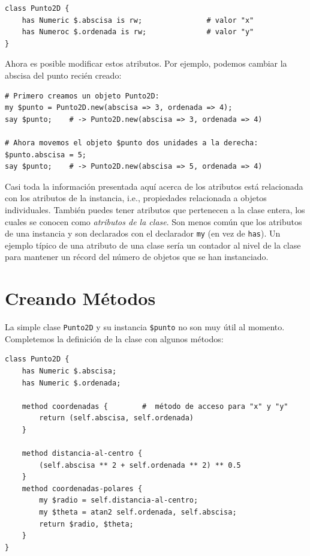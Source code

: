 \begin{verbatim}
class Punto2D {
	has Numeric $.abscisa is rw;               # valor "x"
	has Numeroc $.ordenada is rw;              # valor "y" 
}
\end{verbatim}
%
Ahora es posible modificar estos atributos. Por ejemplo,
podemos cambiar la abscisa del punto recién creado:

\begin{verbatim}
# Primero creamos un objeto Punto2D:
my $punto = Punto2D.new(abscisa => 3, ordenada => 4);
say $punto;    # -> Punto2D.new(abscisa => 3, ordenada => 4)

# Ahora movemos el objeto $punto dos unidades a la derecha:
$punto.abscisa = 5; 
say $punto;    # -> Punto2D.new(abscisa => 5, ordenada => 4)
\end{verbatim}


Casi toda la información presentada aquí acerca de los atributos
está relacionada con los atributos de la instancia, i.e., propiedades
relacionada a objetos individuales. También puedes tener atributos que
pertenecen a la clase entera, los cuales se conocen como \emph{atributos de la
clase}. Son menos común que los atributos de una instancia y son declarados
con el declarador {\tt my} (en vez de {\tt has}). Un ejemplo típico de
una atributo de una clase sería un contador al nivel de la clase para
mantener un récord del número de objetos que se han instanciado.


\section{Creando Métodos}

La simple clase {\tt Punto2D} y su instancia \verb|$punto|
no son muy útil al momento. Completemos la definición de la
clase con algunos métodos:

\begin{verbatim}
class Punto2D {
    has Numeric $.abscisa;
    has Numeric $.ordenada;
    
    method coordenadas {        #  método de acceso para "x" y "y"
        return (self.abscisa, self.ordenada)
    }
    
    method distancia-al-centro {
        (self.abscisa ** 2 + self.ordenada ** 2) ** 0.5
    }
    method coordenadas-polares {
        my $radio = self.distancia-al-centro;
        my $theta = atan2 self.ordenada, self.abscisa;
        return $radio, $theta;
    }
}
\end{verbatim}


